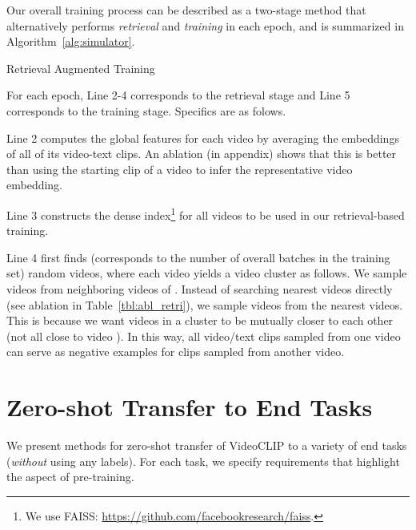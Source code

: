 \documentclass[11pt]{article}
\begin{document}
Our overall training process can be described as a two-stage method that alternatively performs \textit{retrieval} and \textit{training} in each epoch, and is summarized in Algorithm~\ref{alg:simulator}.

\begin{algorithm}[!t]
\LinesNumbered
\DontPrintSemicolon
\caption{Retrieval Augmented Training}
\label{alg:simulator}
\BlankLine


\end{algorithm}

For each epoch, Line 2-4 corresponds to the retrieval stage and Line 5 corresponds to the training stage. Specifics are as folows. 

Line 2 computes the global features  for each video by averaging the embeddings of all  of its video-text clips. An ablation (in appendix) shows that this is better than using the starting clip of a video to infer the representative video embedding.

Line 3 constructs the dense index\footnote{We use FAISS: \url{https://github.com/facebookresearch/faiss}.} for all videos to be used in our retrieval-based training. 

Line 4 first finds  (corresponds to the number of overall batches in the training set) random videos, where each video  yields a video cluster  as follows.
We sample  videos from  neighboring videos of . Instead of searching  nearest videos directly (see ablation in Table~\ref{tbl:abl_retri}), we sample  videos from the  nearest videos.
This is because we want videos in a cluster to be mutually closer to each other (not all close to video ). 
In this way, all video/text clips sampled from one video can serve as negative examples for clips sampled from another video.




\section{Zero-shot Transfer to End Tasks}
\label{sec:zs}
We present methods for zero-shot transfer of \mbox{VideoCLIP} to a variety of end tasks (\textit{without} using any labels).
For each task, we specify requirements that highlight the aspect of pre-training.
\end{document}
